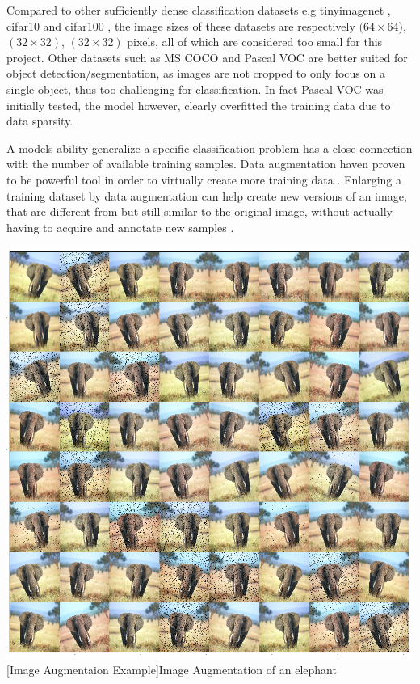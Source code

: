 \begin{enumdescript}
\begin{enumdescript}
		Compared to other sufficiently dense classification datasets e.g \gls{tinyimagenet} \cite{li_cs231n:_2018}, \gls{cifar10} and \gls{cifar100} \cite{krizhevsky_cifar-10_nodate}, the image sizes of these datasets are respectively $(64\times 64$), $(32\times 32)$, $(32\times 32)$ pixels, all of which are considered too small for this project. Other datasets such as MS COCO and Pascal VOC are better suited for object detection/segmentation, as images are not cropped to only focus on a single object, thus too challenging for classification. In fact Pascal VOC was initially tested, the model however, clearly overfitted the training data due to data sparsity. 
		
		\item[Image Augmentation] A models ability generalize a specific classification problem has a close connection with the number of available training samples. Data augmentation haven proven to be powerful tool in order to virtually create more training data \cite{perez_effectiveness_2017}. Enlarging a training dataset by data augmentation can help create new versions of an image, that are different from but still similar to the original image, without actually having to acquire and annotate new samples \cite{goodfellow_deep_2016}.  
		
		\begin{minipage}[t]{\linewidth}
			\centering
			\includegraphics[width=.7\linewidth]{figures/augmentation/augmentation_high_resolution.png}
			[Image Augmentaion Example]{Image Augmentation of an elephant}
			\label{fig:augmentation}
		\end{minipage}
		

\end{enumdescript}
\end{enumdescript}

